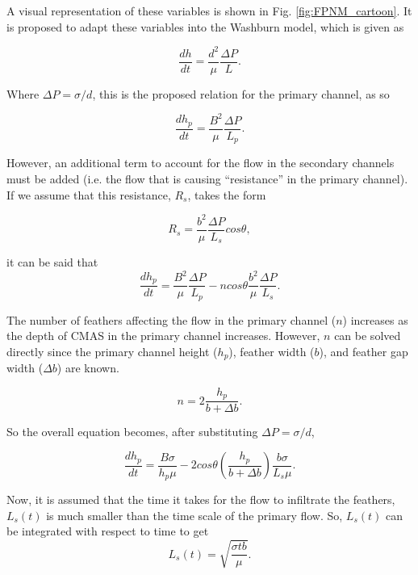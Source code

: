 \documentclass[%
 aip,
 amsmath,amssymb,
 reprint,%
floatfix]{revtex4-1}
\begin{document}
\noindent A visual representation of these variables is shown in Fig. \ref{fig:FPNM_cartoon}. It is proposed to adapt these variables into the Washburn model\cite{Washburn19213}, which is given as

\begin{equation}
    \frac{dh}{dt} = \frac{d^{2}}{\mu}\frac{\Delta P}{L}.
\end{equation}

\noindent Where $\Delta P = \sigma/d$, this is the proposed relation for the primary channel, as so

\begin{equation}
    \frac{dh_{p}}{dt} = \frac{B^{2}}{\mu}\frac{\Delta P}{L_{p}}.
\end{equation}

\noindent However, an additional term to account for the flow in the secondary channels must be added (i.e. the flow that is causing ``resistance'' in the primary channel). If we assume that this resistance, $R_{s}$, takes the form

\begin{equation}
    R_{s} = \frac{b^{2}}{\mu}\frac{\Delta P}{L_{s}}cos\theta,
\end{equation}

\noindent it can be said that 
\begin{equation}
        \frac{dh_{p}}{dt} = \frac{B^{2}}{\mu}\frac{\Delta P}{L_{p}} -ncos\theta\frac{b^{2}}{\mu}\frac{\Delta P}{L_{s}}.
\end{equation}

\noindent The number of feathers affecting the flow in the primary channel ($n$) increases as the depth of CMAS in the primary channel increases. However, $n$ can be solved directly since the primary channel height ($h_p$), feather width ($b$), and feather gap width ($\Delta b$) are known.

\begin{equation}
    n = 2\frac{h_{p}}{b + \Delta b}.
\end{equation}

\noindent So the overall equation becomes, after substituting $\Delta P = \sigma/d$,

\begin{equation}
    \frac{dh_{p}}{dt} = \frac{B \sigma}{h_{p}\mu} - 2 cos\theta\left(\frac{h_{p}}{b + \Delta b} \right)\frac{b \sigma}{L_{s}\mu}.
\end{equation}


\noindent Now, it is assumed that the time it takes for the flow to infiltrate the feathers, $L_{s}(t)$ is much smaller than the time scale of the primary flow. So, $L_{s}(t)$ can be integrated with respect to time to get 
\begin{equation}
    L_{s}\left( t \right) = \sqrt{\frac{\sigma t b}{\mu}}.
\end{equation}
\end{document}
